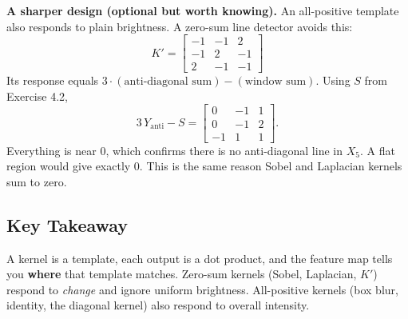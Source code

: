 \textbf{A sharper design (optional but worth knowing).} An all-positive template also responds to plain brightness. A zero-sum line detector avoids this:
\[
K' = \begin{bmatrix}-1&-1&2\\-1&2&-1\\2&-1&-1\end{bmatrix}
\]
Its response equals $3\cdot(\text{anti-diagonal sum}) - (\text{window sum})$. Using $S$ from Exercise 4.2,
\[
3\,Y_{\text{anti}} - S = \begin{bmatrix}0&-1&1\\0&-1&2\\-1&1&1\end{bmatrix}.
\]
Everything is near 0, which confirms there is no anti-diagonal line in $X_5$. A flat region would give exactly 0. This is the same reason Sobel and Laplacian kernels sum to zero.

\subsection*{Key Takeaway}

A kernel is a template, each output is a dot product, and the feature map tells you \textbf{where} that template matches. Zero-sum kernels (Sobel, Laplacian, $K'$) respond to \emph{change} and ignore uniform brightness. All-positive kernels (box blur, identity, the diagonal kernel) also respond to overall intensity.